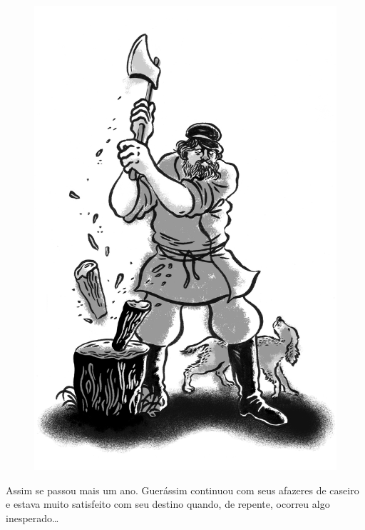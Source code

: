 \begin{figure}%
\vspace*{-1.8cm}
\hspace*{-1.8cm}\includegraphics{./imgs/cena3.jpg}
\end{figure}

Assim se passou mais um ano. Guerássim continuou com seus afazeres de
caseiro e estava muito satisfeito com seu destino quando, de repente,
ocorreu algo inesperado\ldots{}


